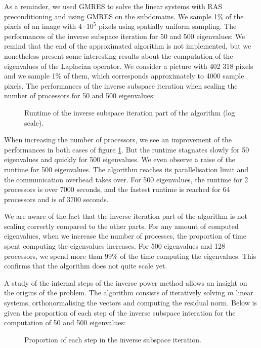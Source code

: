 \ifthesis
 As a reminder, we used GMRES to solve the linear systems with RAS preconditioning and using GMRES on the subdomains.
 We sample 1\% of the pixels of an image with \(4 \cdot 10^5\) pixels using spatially uniform sampling.
 The performances of the inverse subspace iteration for 50 and 500 eigenvalues:
\else
 We remind that the end of the approximated algorithm is not implemented, but we nonetheless present some interesting results about the computation of the eigenvalues of the Laplacian operator.
 We consider a picture with 402 318 pixels and we sample 1\% of them, which corresponds approximately to 4000 sample pixels.
 The performances of the inverse subspace iteration when scaling the number of processors for 50 and 500 eigenvalues:
\fi

\begin{figure}[H]
 \centering
 
 \caption{Runtime of the inverse subspace iteration part of the algorithm (log scale).}
 \label{fig:inv_it_runtime}
\end{figure}

When increasing the number of processors, we see an improvement of the performances in both cases of figure \ref{fig:inv_it_runtime}.
But the runtime stagnates slowly for 50 eigenvalues and quickly for 500 eigenvalues.
We even observe a raise of the runtime for 500 eigenvalues.
The algorithm reaches its parallelisation limit and the communication overhead takes over.
For 500 eigenvalues, the runtime for 2 processors is over 7000 seconds, and the fastest runtime is reached for 64 processors and is of 3700 seconds.

\ifthesis
 We are aware of the fact that the inverse iteration part of the algorithm is not scaling correctly compared to the other parts.
 For any amount of computed eigenvalues, when we increase the number of processes, the proportion of time spent computing the eigenvalues increases.
 For 500 eigenvalues and 128 processors, we spend more than 99\% of the time computing the eigenvalues.
 This confirms that the algorithm does not quite scale yet.
\fi

A study of the internal steps of the inverse power method allows an insight on the origins of the problem.
The algorithm consists of iteratively solving \(m\) linear systems, orthonormalising the vectors and computing the residual norm.
\ifthesis
 Below is given the proportion of each step of the inverse subspace interation for the computation of 50 and 500 eigenvalues:

 \begin{figure}[H]
  \centering
  
  \caption{Proportion of each step in the inverse subspace iteration.}
  \label{fig:inv_it_proportion}
 \end{figure}


